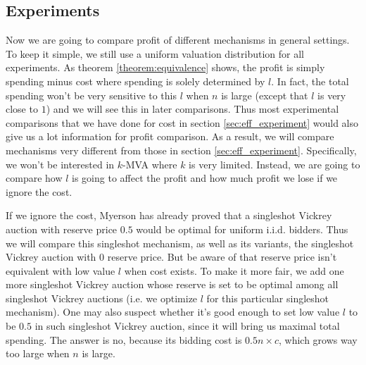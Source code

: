 \subsection{Experiments}

Now we are going to compare profit of different mechanisms in general settings.
To keep it simple, we still use a uniform valuation distribution for all
experiments.  As theorem \ref{theorem:equivalence} shows, the profit is simply
spending minus cost where spending is solely determined by $l$. In fact, the
total spending won't be very sensitive to this $l$ when $n$ is large (except
that $l$ is very close to $1$) and we will see this in later comparisons. Thus
most experimental comparisons that we have done for cost in section
\ref{sec:eff_experiment} would also give us a lot information for profit
comparison. As a result, we will compare mechanisms very different from those
in section \ref{sec:eff_experiment}. Specifically, we won't be interested in
$k$-MVA where $k$ is very limited. Instead, we are going to compare how $l$
is going to affect the profit and how much profit we lose if we ignore the cost.

If we ignore the cost, Myerson has already proved that a singleshot Vickrey
auction with reserve price $0.5$ would be optimal for uniform i.i.d. bidders.
Thus we will compare this singleshot mechanism, as well as its variants, the
singleshot Vickrey auction with $0$ reserve price. But be aware of that reserve
price isn't equivalent with low value $l$  when cost exists. To make it more fair,
we add one more singleshot Vickrey auction whose reserve is set to be optimal
among all singleshot Vickrey auctions (i.e. we optimize $l$ for this particular
singleshot mechanism).
One may also suspect whether it's good enough to set low value $l$ to be $0.5$
in such singleshot Vickrey auction, since it will bring us maximal total
spending. The answer is no, because its bidding cost is $0.5 n \times c$, which
grows way too large when $n$ is large.


